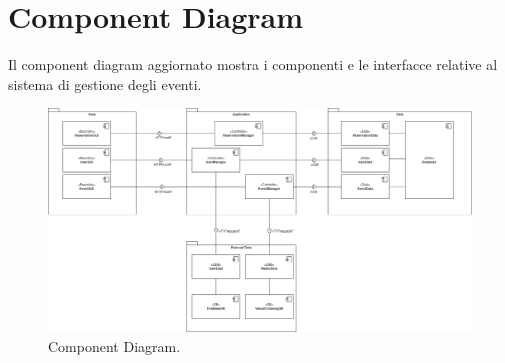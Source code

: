 \section{Component Diagram} 
Il component diagram aggiornato mostra i componenti e le interfacce relative al sistema di gestione degli eventi.
\begin{figure}[h!]
	\centering
	\includegraphics[width=0.8\linewidth]{diagrams/Component.drawio.png}
	\caption{Component Diagram.}
	\label{fig:ComponentDiagram}
\end{figure}